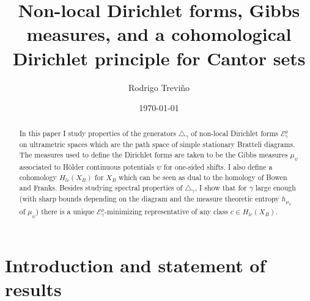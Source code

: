 \documentclass[12pt]{amsart}
\theoremstyle{plain}
\theoremstyle{definition}
\begin{document}
\title[Non-local Dirichlet forms, Gibbs measures, and a cohomological Dirichlet principle for Cantor sets]
      {Non-local Dirichlet forms, Gibbs measures, and a cohomological Dirichlet principle for Cantor sets}
      \author{Rodrigo Trevi\~no}
      \address{Department of Mathematics, The University of Maryland, College Park, USA}
      \date{\today}
      \begin{abstract}
        In this paper I study properties of the generators $\triangle_\gamma$ of non-local Dirichlet forms $\mathcal{E}^\mu_\gamma$ on ultrametric spaces which are the path space of simple stationary Bratteli diagrams. The measures used to define the Dirichlet forms are taken to be the Gibbs measures $\mu_\psi$ associated to H\"older continuous potentials $\psi$ for one-sided shifts. I also define a cohomology $H_{lc}(X_B)$ for $X_B$ which can be seen as dual to the homology of Bowen and Franks. Besides studying spectral properties of $\triangle_\gamma$, I show that for $\gamma$ large enough (with sharp bounds depending on the diagram and the measure theoretic entropy $h_{\mu_\psi}$ of $\mu_\psi$) there is a unique $\mathcal{E}^\mu_\gamma$-minimizing representative of any class $c\in H_{lc}(X_B)$.
      \end{abstract}
      \maketitle

\section{Introduction and statement of results}
\end{document}
